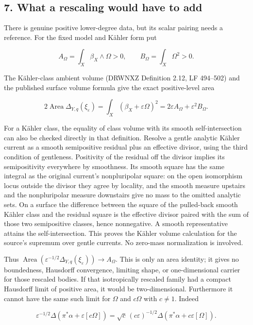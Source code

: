 \documentclass[11pt]{article}
\begin{document}
\subsection{7. What a rescaling would have to add}

There is genuine positive lower-\allowbreak{}degree data, but its scalar pairing needs a reference. For the fixed model and Kähler form put

\[A_\Omega=\int_X\beta_X\wedge\Omega>0,\qquad B_\Omega=\int_X\Omega^2>0.\]

The Kähler-\allowbreak{}class ambient volume (DRWNXZ Definition 2.12, LF 494–502) and the published surface volume formula give the exact positive-\allowbreak{}level area

\[2\operatorname{Area}\Delta_{Y,q}(\xi_\varepsilon)=\int_X(\beta_X+\varepsilon\Omega)^2=2\varepsilon A_\Omega+\varepsilon^2B_\Omega.\]

For a Kähler class, the equality of class volume with its smooth self-\allowbreak{}intersection can also be checked directly in that definition. Resolve a gentle analytic Kähler current as a smooth semipositive residual plus an effective divisor, using the third condition of gentleness. Positivity of the residual off the divisor implies its semipositivity everywhere by smoothness. Its smooth square has the same integral as the original current's nonpluripolar square: on the open isomorphism locus outside the divisor they agree by locality, and the smooth measure upstairs and the nonpluripolar measure downstairs give no mass to the omitted analytic sets. On a surface the difference between the square of the pulled-\allowbreak{}back smooth Kähler class and the residual square is the effective divisor paired with the sum of those two semipositive classes, hence nonnegative. A smooth representative attains the self-\allowbreak{}intersection. This proves the Kähler volume calculation for the source's supremum over gentle currents. No zero-\allowbreak{}mass normalization is involved.

Thus $\operatorname{Area}(\varepsilon^{-1/2}\Delta_{Y,q}(\xi_\varepsilon))\to A_\Omega$. This is only an area identity; it gives no boundedness, Hausdorff convergence, limiting shape, or one-\allowbreak{}dimensional carrier for those rescaled bodies. If that isotropically rescaled family had a compact Hausdorff limit of positive area, it would be two-\allowbreak{}dimensional. Furthermore it cannot have the same such limit for $\Omega$ and $c\Omega$ with $c\ne1$. Indeed

\[\varepsilon^{-1/2}\Delta(\pi^*\alpha+\varepsilon[c\Omega])=\sqrt c\,(c\varepsilon)^{-1/2}\Delta(\pi^*\alpha+c\varepsilon[\Omega]).\]
\end{document}
